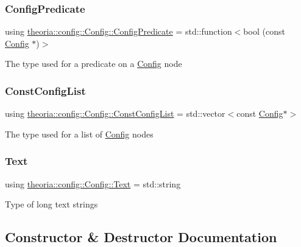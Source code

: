 \subsubsection{\texorpdfstring{Config\+Predicate}{ConfigPredicate}}
{\footnotesize\ttfamily using \hyperlink{classtheoria_1_1config_1_1Config_a293ebfd7146d935e232a066f7e6fa279}{theoria\+::config\+::\+Config\+::\+Config\+Predicate} =  std\+::function$<$bool (const \hyperlink{classtheoria_1_1config_1_1Config}{Config} $\ast$)$>$}

The type used for a predicate on a \hyperlink{classtheoria_1_1config_1_1Config}{Config} node \mbox{\label{classtheoria_1_1config_1_1Config_a61230728ffa4d92667a536c8c0f0ca30}} 
\subsubsection{\texorpdfstring{Const\+Config\+List}{ConstConfigList}}
{\footnotesize\ttfamily using \hyperlink{classtheoria_1_1config_1_1Config_a61230728ffa4d92667a536c8c0f0ca30}{theoria\+::config\+::\+Config\+::\+Const\+Config\+List} =  std\+::vector$<$const \hyperlink{classtheoria_1_1config_1_1Config}{Config}$\ast$$>$}

The type used for a list of \hyperlink{classtheoria_1_1config_1_1Config}{Config} nodes \mbox{\label{classtheoria_1_1config_1_1Config_ac1325f2d355e7c617dcd16d561ee2429}} 
\subsubsection{\texorpdfstring{Text}{Text}}
{\footnotesize\ttfamily using \hyperlink{classtheoria_1_1config_1_1Config_ac1325f2d355e7c617dcd16d561ee2429}{theoria\+::config\+::\+Config\+::\+Text} =  std\+::string\hspace{0.3cm}{\ttfamily [protected]}}

Type of long text strings 

\subsection{Constructor \& Destructor Documentation}
\mbox{\label{classtheoria_1_1config_1_1Config_abd0c571c116924871e30444b192b792a}} 
